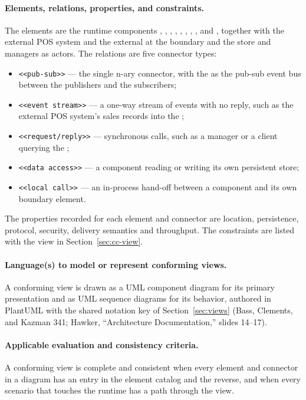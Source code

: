 \paragraph{Elements, relations, properties, and constraints.}
The elements are the runtime components \POSAdapter, \StoreAgent, \StoreLocalInventory,
\Outbox, \CFE, \DCAgent, \CentralMasterInventory, \ShippingOrderFulfillment,
\StoreTrackingClient and \ReportingClient, together with the external POS system and the
external \AnalyticsClient at the boundary and the store and \DC managers as actors. The
relations are five connector types:
\begin{itemize}[nosep]
  \item \texttt{<<pub-sub>>} --- the single n-ary \IEP connector, with the \CFE as the
  pub-sub event bus between the publishers and the subscribers;
  \item \texttt{<<event stream>>} --- a one-way stream of events with no reply, such as
  the external POS system's sales records into the \POSAdapter;
  \item \texttt{<<request/reply>>} --- synchronous calls, such as a manager or a client
  querying the \CentralMasterInventory;
  \item \texttt{<<data access>>} --- a component reading or writing its own persistent
  store;
  \item \texttt{<<local call>>} --- an in-process hand-off between a component and its
  own boundary element.
\end{itemize}
The properties recorded for each element and connector are location, persistence,
protocol, security, delivery semantics and throughput.
The constraints are listed with the view in Section~\ref{sec:cc-view}.

\paragraph{Language(s) to model or represent conforming views.}
A conforming view is drawn as a UML component diagram for its primary presentation and
as UML sequence diagrams for its behavior, authored in PlantUML with the shared
notation key of Section~\ref{sec:views} (Bass, Clements, and Kazman 341; Hawker,
``Architecture Documentation,'' slides 14--17).

\paragraph{Applicable evaluation and consistency criteria.}
A conforming view is complete and consistent when every element and connector in a
diagram has an entry in the element catalog and the reverse, and when every scenario
that touches the runtime has a path through the view.

